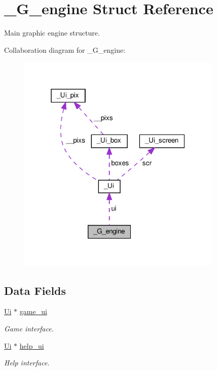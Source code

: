 \hypertarget{struct__G__engine}{}\section{\+\_\+\+G\+\_\+engine Struct Reference}
\label{struct__G__engine}


Main graphic engine structure.  




Collaboration diagram for \+\_\+\+G\+\_\+engine\+:
\nopagebreak
\begin{figure}[H]
\begin{center}
\leavevmode
\includegraphics[width=277pt]{struct__G__engine__coll__graph}
\end{center}
\end{figure}
\subsection*{Data Fields}
\begin{DoxyCompactItemize}
\item 
\mbox{\label{struct__G__engine_a56b776923e2d67db123587e106132365}} 
\hyperlink{struct__Ui}{Ui} $\ast$ \hyperlink{struct__G__engine_a56b776923e2d67db123587e106132365}{game\+\_\+ui}
\begin{DoxyCompactList}\small\item\em Game interface. \end{DoxyCompactList}\item 
\mbox{\label{struct__G__engine_a76c426bc9bdd8031c0961abd5530e9c3}} 
\hyperlink{struct__Ui}{Ui} $\ast$ \hyperlink{struct__G__engine_a76c426bc9bdd8031c0961abd5530e9c3}{help\+\_\+ui}
\begin{DoxyCompactList}\small\item\em Help interface. \end{DoxyCompactList}\end{DoxyCompactItemize}


